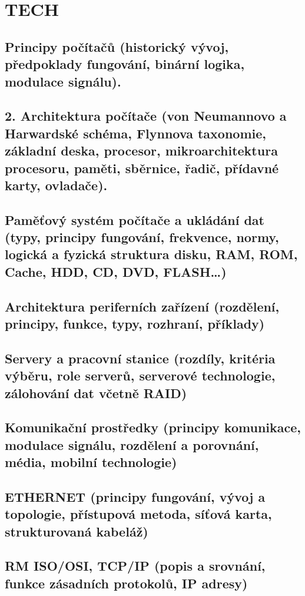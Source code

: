 \chapter{TECH}

\section{Principy počítačů (historický vývoj, předpoklady fungování, binární logika, modulace signálu).}

\section{2.       Architektura počítače (von Neumannovo a Harwardské schéma, Flynnova taxonomie, základní deska, procesor, mikroarchitektura procesoru, paměti, sběrnice, řadič, přídavné karty, ovladače).
}

\section{Paměťový systém počítače a ukládání dat (typy, principy fungování, frekvence, normy, logická a fyzická struktura disku, RAM, ROM, Cache, HDD, CD, DVD, FLASH…)}

\section{Architektura periferních zařízení (rozdělení, principy, funkce, typy, rozhraní, příklady)}

\section{Servery a pracovní stanice (rozdíly, kritéria výběru, role serverů, serverové technologie, zálohování dat včetně RAID)}

\section{Komunikační prostředky (principy komunikace, modulace signálu, rozdělení a porovnání, média, mobilní technologie)}

\section{ETHERNET (principy fungování, vývoj a topologie, přístupová metoda, síťová karta, strukturovaná kabeláž)}

\section{RM ISO/OSI, TCP/IP (popis a srovnání, funkce zásadních protokolů, IP adresy)}

